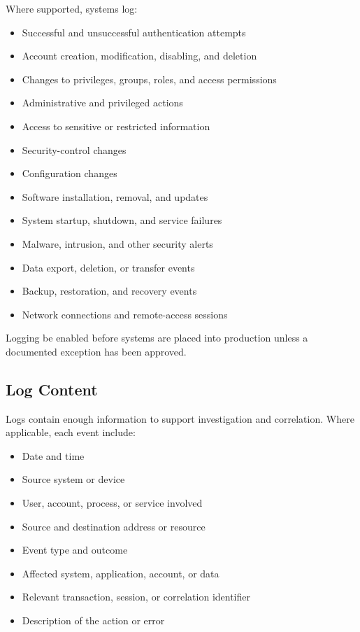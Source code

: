 Where supported, systems \should{} log:
\begin{itemize}
    \item Successful and unsuccessful authentication attempts
    \item Account creation, modification, disabling, and deletion
    \item Changes to privileges, groups, roles, and access permissions
    \item Administrative and privileged actions
    \item Access to sensitive or restricted information
    \item Security-control changes
    \item Configuration changes
    \item Software installation, removal, and updates
    \item System startup, shutdown, and service failures
    \item Malware, intrusion, and other security alerts
    \item Data export, deletion, or transfer events
    \item Backup, restoration, and recovery events
    \item Network connections and remote-access sessions
\end{itemize}

Logging \must{} be enabled before systems are placed into production unless a documented exception has been approved.

\subsection{Log Content}

Logs \should{} contain enough information to support investigation and correlation. Where applicable, each event \should{} include:
\begin{itemize}
    \item Date and time
    \item Source system or device
    \item User, account, process, or service involved
    \item Source and destination address or resource
    \item Event type and outcome
    \item Affected system, application, account, or data
    \item Relevant transaction, session, or correlation identifier
    \item Description of the action or error
\end{itemize}


